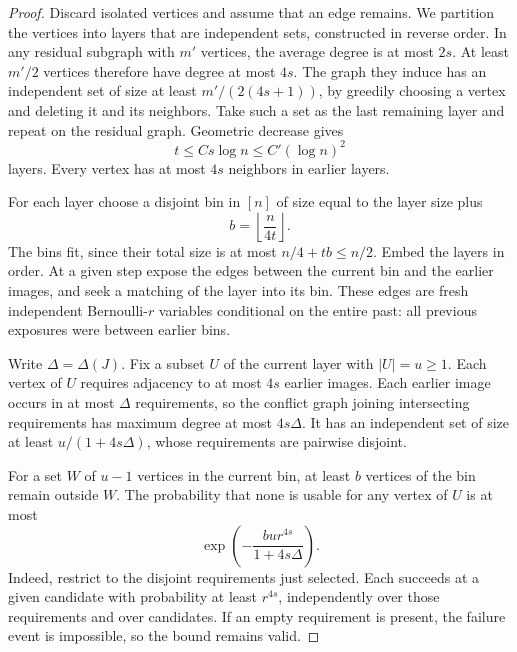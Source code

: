\begin{proof}
Discard isolated vertices and assume that an edge remains.
We partition the vertices into layers that are independent sets, constructed
in reverse order. In any residual subgraph with $m'$ vertices,
the average degree is at most $2s$. At least $m'/2$ vertices
therefore have degree at most $4s$. The graph they induce has
an independent set of size at least $m'/(2(4s+1))$, by greedily
choosing a vertex and deleting it and its neighbors. Take such
a set as the last remaining layer and repeat on the residual
graph. Geometric decrease gives
\begin{equation}\label{eq:layers}
 t\leq C s\log n\leq C'(\log n)^2
\end{equation}
layers. Every vertex has at most $4s$ neighbors in earlier layers.

For each layer choose a disjoint bin in $[n]$ of size equal to
the layer size plus
\[
 b=\left\lfloor\frac{n}{4t}\right\rfloor.
\]
The bins fit, since their total size is at most $n/4+tb\leq n/2$.
Embed the layers in order. At a given step expose the edges
between the current bin and the earlier images, and seek a
matching of the layer into its bin. These edges are fresh
independent Bernoulli-$r$ variables conditional on the entire
past: all previous exposures were between earlier bins.

Write $\Delta=\Delta(J)$. Fix a subset $U$ of the current
layer with $|U|=u\geq1$. Each vertex of $U$ requires adjacency
to at most $4s$ earlier images. Each earlier image occurs in at
most $\Delta$ requirements, so the conflict graph joining
intersecting requirements has maximum degree at most $4s\Delta$.
It has an independent set of size at least
$u/(1+4s\Delta)$, whose requirements are pairwise disjoint.

For a set $W$ of $u-1$ vertices in the current bin, at least $b$
vertices of the bin remain outside $W$. The probability that
none is usable for any vertex of $U$ is at most
\begin{equation}\label{eq:hall-failure}
 \exp\!\left(-\frac{bu r^{4s}}{1+4s\Delta}\right).
\end{equation}
Indeed, restrict to the disjoint requirements just selected.
Each succeeds at a given candidate with probability at least
$r^{4s}$, independently over those requirements and over
candidates. If an empty requirement is present, the failure
event is impossible, so the bound remains valid.


\end{proof}

